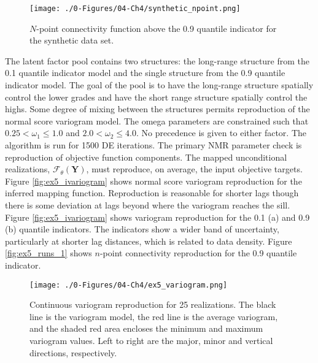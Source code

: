 \begin{figure}[htb!]
    \centering
    \texttt{[image: ./0-Figures/04-Ch4/synthetic\_npoint.png]}
    \caption{$N$-point connectivity function above the 0.9 quantile indicator for the synthetic data set.}
    \label{fig:synthetic_npoint}
\end{figure}

The latent factor pool contains two structures: the long-range structure from the 0.1 quantile indicator model and the single structure from the 0.9 quantile indicator model. The goal of the pool is to have the long-range structure spatially control the lower grades and have the short range structure spatially control the highs. Some degree of mixing between the structures permits reproduction of the normal score variogram model. The omega parameters are constrained such that $0.25 < \omega_{1} \leq 1.0$ and $2.0 < \omega_{2} \leq 4.0$. No precedence is given to either factor. The algorithm is run for 1500 \gls{DE} iterations. The primary \gls{NMR} parameter check is reproduction of objective function components. The mapped unconditional realizations, $\mathcal{F}_{\theta}\left(\mathbf{Y}\right)$, must reproduce, on average, the input objective targets. Figure \ref{fig:ex5_ivariogram} shows normal score variogram reproduction for the inferred mapping function. Reproduction is reasonable for shorter lags though there is some deviation at lags beyond where the variogram reaches the sill. Figure \ref{fig:ex5_ivariogram} shows variogram reproduction for the 0.1 (a) and 0.9 (b) quantile indicators. The indicators show a wider band of uncertainty, particularly at shorter lag distances, which is related to data density. Figure \ref{fig:ex5_runs_1} shows $n$-point connectivity reproduction for the 0.9 quantile indicator.

\begin{figure}[htb!]
    \centering
    \texttt{[image: ./0-Figures/04-Ch4/ex5\_variogram.png]}
    \caption{Continuous variogram reproduction for 25 realizations. The black line is the variogram model, the red line is the average variogram, and the shaded red area encloses the minimum and maximum variogram values. Left to right are the major, minor and vertical directions, respectively.}
    \label{fig:ex5_variogram}
\end{figure}

